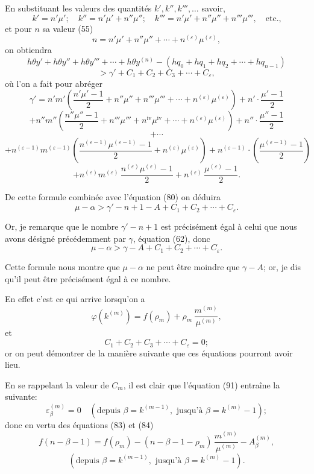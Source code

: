 \documentclass{article}
\begin{document}
En substituant les valeurs des quantités $k', k'', k''', \ldots$ savoir,
\[ k' = n'\mu'; \quad k'' = n'\mu' + n''\mu''; \quad k''' = n'\mu' + n''\mu'' + n'''\mu''', \quad \text{etc.,} \]
et pour $n$ sa valeur (55)
\[ n = n'\mu' + n''\mu'' + \cdots + n^{(\varepsilon)}\mu^{(\varepsilon)}, \]
on obtiendra
\[ h\theta y' + h\theta y'' + h\theta y''' + \cdots + h\theta y^{(n)} - (hq_0+hq_1+hq_2+\cdots+hq_{n-1}) \]
\[ > \gamma' + C_1 + C_2 + C_3 + \cdots + C_\varepsilon, \]
où l'on a fait pour abréger
\[ \gamma' = n'm'\left(\frac{n'\mu'-1}{2}+n''\mu''+n'''\mu'''+\cdots+n^{(\varepsilon)}\mu^{(\varepsilon)}\right)+n' \cdot \frac{\mu'-1}{2} \]
\[ + n''m''\left(\frac{n''\mu''-1}{2}+n'''\mu'''+n^{\text{iv}}\mu^{\text{iv}}+\cdots+n^{(\varepsilon)}\mu^{(\varepsilon)}\right)+n'' \cdot \frac{\mu''-1}{2} \]
\[ + \cdots \]
\[ + n^{(\varepsilon-1)}m^{(\varepsilon-1)}\left(\frac{n^{(\varepsilon-1)}\mu^{(\varepsilon-1)}-1}{2}+n^{(\varepsilon)}\mu^{(\varepsilon)}\right)+n^{(\varepsilon-1)} \cdot \left(\frac{\mu^{(\varepsilon-1)}-1}{2}\right) \]
\[ + n^{(\varepsilon)}m^{(\varepsilon)}\,\frac{n^{(\varepsilon)}\mu^{(\varepsilon)}-1}{2}+n^{(\varepsilon)}\,\frac{\mu^{(\varepsilon)}-1}{2}. \tag{88} \]

De cette formule combinée avec l'équation (80) on déduira
\[ \mu - \alpha > \gamma' - n + 1 - A + C_1 + C_2 + \cdots + C_\varepsilon. \tag{89} \]

Or, je remarque que le nombre $\gamma' - n + 1$ est précisément égal à celui que nous avons désigné précédemment par $\gamma$, équation (62), donc
\[ \mu - \alpha > \gamma - A + C_1 + C_2 + \cdots + C_\varepsilon. \tag{90} \]

Cette formule nous montre que $\mu-\alpha$ ne peut être moindre que $\gamma-A$; or, je dis qu'il peut être précisément égal à ce nombre.

En effet c'est ce qui arrive lorsqu'on a
\[ \varphi(k^{(m)}) = f(\rho_m) + \rho_m\,\frac{m^{(m)}}{\mu^{(m)}}, \tag{91} \]
et
\[ C_1 + C_2 + C_3 + \cdots + C_\varepsilon = 0; \]
or on peut démontrer de la manière suivante que ces équations pourront avoir lieu.

En se rappelant la valeur de $C_m$, il est clair que l'équation (91) entraîne la suivante:
\[ \varepsilon_\beta^{(m)} = 0 \quad (\text{depuis } \beta = k^{(m-1)}, \text{ jusqu'à } \beta = k^{(m)}-1); \]
donc en vertu des équations (83) et (84)
\[ f(n-\beta-1) = f(\rho_m) - (n-\beta-1-\rho_m)\,\frac{m^{(m)}}{\mu^{(m)}} - A_\beta^{(m)}, \]
\[ (\text{depuis } \beta = k^{(m-1)}, \text{ jusqu'à } \beta = k^{(m)}-1). \tag{92} \]
\end{document}
